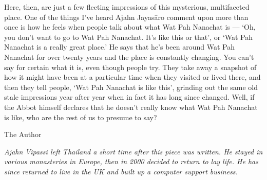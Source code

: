 Here, then, are just a few fleeting impressions of this mysterious,
multifaceted place. One of the things I've heard Ajahn Jayasāro comment
upon more than once is how he feels when people talk about what Wat Pah
Nanachat is --- `Oh, you don't want to go to Wat Pah Nanachat. It's like
this or that', or `Wat Pah Nanachat is a really great place.' He says
that he's been around Wat Pah Nanachat for over twenty years and the
place is constantly changing. You can't say for certain what it is, even
though people try. They take away a snapshot of how it might have been
at a particular time when they visited or lived there, and then they
tell people, `Wat Pah Nanachat is like this', grinding out the same old
stale impressions year after year when in fact it has long since
changed. Well, if the Abbot himself declares that he doesn't really know
what Wat Pah Nanachat is like, who are the rest of us to presume to say?

The Author

\emph{Ajahn Vipassi left Thailand a short time after this piece was
written. He stayed in various monasteries in Europe, then in 2000
decided to return to lay life. He has since returned to live in the UK
and built up a computer support business.}

